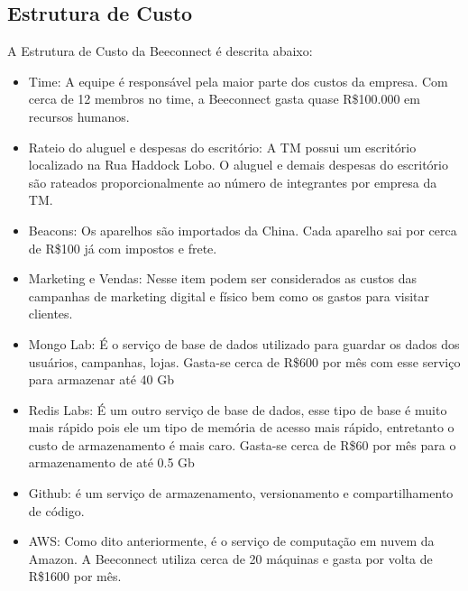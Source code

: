 \subsection{Estrutura de Custo}
\label{cha:estrutura_de_custo}
A Estrutura de Custo da Beeconnect é descrita abaixo:
\begin{itemize}
\item Time: A equipe é responsável pela maior parte dos custos da empresa. Com cerca de 12 membros no time, a Beeconnect gasta quase R\$100.000 em recursos humanos.
\item Rateio do aluguel e despesas do escritório: A TM possui um escritório localizado na Rua Haddock Lobo. O aluguel e demais despesas do escritório são rateados proporcionalmente ao número de integrantes por empresa da TM.
\item Beacons: Os aparelhos são importados da China. Cada aparelho sai por cerca de R\$100 já com impostos e frete.
\item Marketing e Vendas: Nesse item podem ser considerados as custos das campanhas de marketing digital e físico bem como os gastos para visitar clientes.
\item Mongo Lab: É o serviço de base de dados utilizado para guardar os dados dos usuários, campanhas, lojas. Gasta-se cerca de R\$600 por mês com esse serviço para armazenar até 40 Gb
\item Redis Labs: É um outro serviço de base de dados, esse tipo de base é muito mais rápido pois ele um tipo de memória de acesso mais rápido, entretanto o custo de armazenamento é mais caro. Gasta-se cerca de R\$60 por mês para o armazenamento de até 0.5 Gb
\item Github: é um serviço de armazenamento, versionamento e compartilhamento de código.
\item AWS: Como dito anteriormente, é o serviço de computação em nuvem da Amazon. A Beeconnect utiliza cerca de 20 máquinas e gasta por volta de R\$1600 por mês.
\end{itemize}

